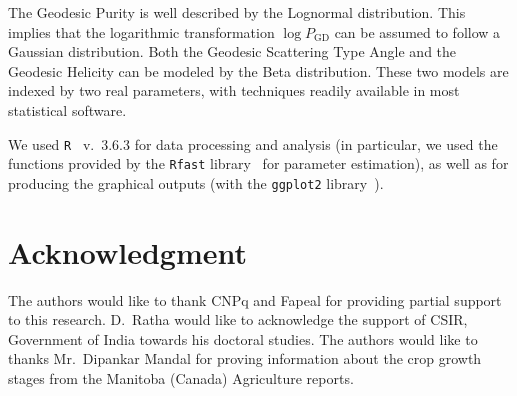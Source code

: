 \documentclass[journal]{IEEEtran}
\begin{document}
	The Geodesic Purity is well described by the Lognormal distribution.
	This implies that the logarithmic transformation $\log P_{\text{GD}}$ can be assumed to follow a Gaussian distribution.
	Both the Geodesic Scattering Type Angle and the Geodesic Helicity can be modeled by the Beta distribution.
	These two models are indexed by two real parameters, with techniques readily available in most statistical software.
	
	We used \texttt{R}~\cite{RManual} v.~3.6.3 for data processing and analysis (in particular, we used the functions provided by the \texttt{Rfast} library~\cite{Rfast} for parameter estimation), as well as for producing the graphical outputs (with the \texttt{ggplot2} library~\cite{ggplot2}).
	
	\section*{Acknowledgment}
	
	The authors would like to thank CNPq and Fapeal for providing partial support to this research. 
	D.\ Ratha would like to acknowledge the support of CSIR, Government of India towards his doctoral studies. The authors would like to thanks Mr.\ Dipankar Mandal for proving information about the crop growth stages from the Manitoba (Canada) Agriculture reports.
	
	
	
	
\end{document}
